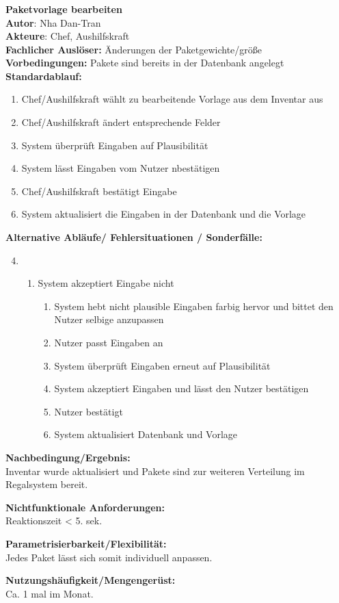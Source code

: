 \subsubsection*{}
\textbf{Paketvorlage bearbeiten}\bigskip\\
\textbf{Autor}: Nha Dan-Tran\\
 \textbf{Akteure}: Chef, Aushilfskraft\\
 \textbf{Fachlicher Auslöser:} Änderungen der Paketgewichte/größe\\
 \textbf{Vorbedingungen: }Pakete sind bereits in der Datenbank angelegt\\
 \textbf{Standardablauf:} 

\begin{enumerate}
    \item Chef/Aushilfskraft wählt zu bearbeitende Vorlage aus dem Inventar aus
    \item Chef/Aushilfskraft ändert entsprechende Felder
    \item System überprüft Eingaben auf Plausibilität
    \item System lässt Eingaben vom Nutzer nbestätigen
    \item Chef/Aushilfskraft bestätigt Eingabe
    \item System aktualisiert die Eingaben in der Datenbank und die Vorlage
\end{enumerate}

\textbf{Alternative Abläufe/ Fehlersituationen / Sonderfälle:}
\begin{enumerate}\setcounter{enumi}{3}
    \item[] \begin{enumerate}
        \item System akzeptiert Eingabe nicht
        \begin{enumerate}
            \item System hebt nicht plausible Eingaben farbig hervor und bittet den Nutzer selbige anzupassen
            \item Nutzer passt Eingaben an
            \item System überprüft Eingaben erneut auf Plausibilität
            \item System akzeptiert Eingaben und lässt den Nutzer bestätigen
            \item Nutzer bestätigt
            \item System aktualisiert Datenbank und Vorlage
        \end{enumerate}
    \end{enumerate}
\end{enumerate}

\noindent\textbf{Nachbedingung/Ergebnis:}\\
Inventar wurde aktualisiert und Pakete sind zur weiteren Verteilung im Regalsystem bereit.

\noindent\textbf{Nichtfunktionale Anforderungen:\\}
Reaktionszeit < 5. sek.

\noindent\textbf{Parametrisierbarkeit/Flexibilität:}\\
Jedes Paket lässt sich somit individuell anpassen.

\noindent\textbf{Nutzungshäufigkeit/Mengengerüst:}\\
Ca. 1 mal im Monat.